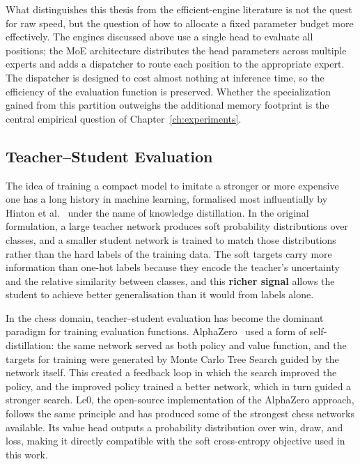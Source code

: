 What distinguishes this thesis from the efficient-engine literature is not the quest for raw speed, but the question of how to allocate a fixed parameter budget more effectively. The engines discussed above use a single head to evaluate all positions; the MoE architecture distributes the head parameters across multiple experts and adds a dispatcher to route each position to the appropriate expert. The dispatcher is designed to cost almost nothing at inference time, so the efficiency of the evaluation function is preserved. Whether the specialization gained from this partition outweighs the additional memory footprint is the central empirical question of Chapter~\ref{ch:experiments}.

\subsection{Teacher--Student Evaluation}\label{sec:rw-teacher}

The idea of training a compact model to imitate a stronger or more expensive one has a long history in machine learning, formalised most influentially by Hinton et al.~\cite{hinton2015distilling} under the name of knowledge distillation. In the original formulation, a large teacher network produces soft probability distributions over classes, and a smaller student network is trained to match those distributions rather than the hard labels of the training data. The soft targets carry more information than one-hot labels because they encode the teacher's uncertainty and the relative similarity between classes, and this \textbf{richer signal} allows the student to achieve better generalisation than it would from labels alone.

In the chess domain, teacher--student evaluation has become the dominant paradigm for training evaluation functions. AlphaZero~\cite{silver2018alphazero} used a form of self-distillation: the same network served as both policy and value function, and the targets for training were generated by Monte Carlo Tree Search guided by the network itself. This created a feedback loop in which the search improved the policy, and the improved policy trained a better network, which in turn guided a stronger search. Lc0, the open-source implementation of the AlphaZero approach, follows the same principle and has produced some of the strongest chess networks available. Its value head outputs a probability distribution over win, draw, and loss, making it directly compatible with the soft cross-entropy objective used in this work.

